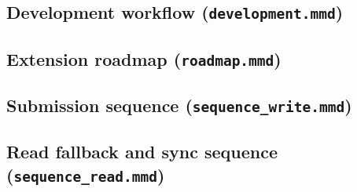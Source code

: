 \documentclass[11pt,a4paper]{article}
\begin{document}
\subsection*{Development workflow (\texttt{development.mmd})}


\subsection*{Extension roadmap (\texttt{roadmap.mmd})}


\subsection*{Submission sequence (\texttt{sequence\_write.mmd})}


\subsection*{Read fallback and sync sequence (\texttt{sequence\_read.mmd})}

\end{document}
